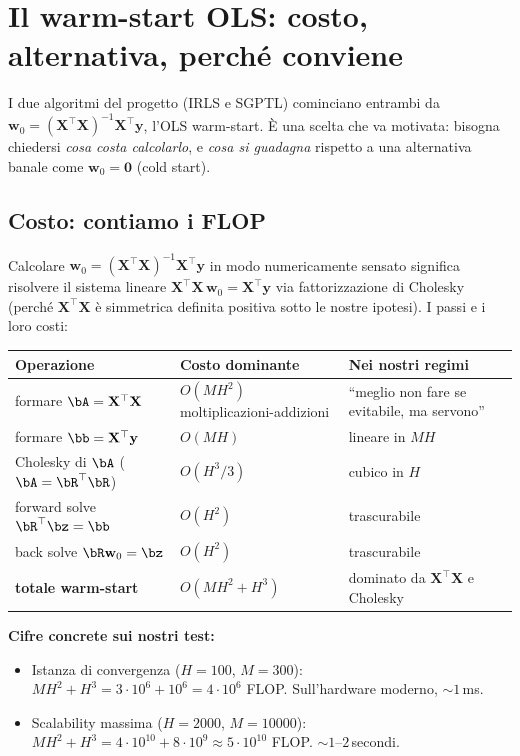 \documentclass[11pt,a4paper]{article}
\newcommand{\bw}{\mathbf{w}}
\newcommand{\by}{\mathbf{y}}
\newcommand{\bX}{\mathbf{X}}
\newcommand{\bzero}{\mathbf{0}}
\theoremstyle{definition}
\begin{document}
\section{Il warm-start OLS: costo, alternativa, perché conviene}
\label{sec:warmstart}

I due algoritmi del progetto (IRLS e SGPTL) cominciano entrambi da $\bw_0 = (\bX^\top\bX)^{-1}\bX^\top\by$, l'OLS warm-start. È una scelta che va motivata: bisogna chiedersi \emph{cosa costa calcolarlo}, e \emph{cosa si guadagna} rispetto a una alternativa banale come $\bw_0 = \bzero$ (cold start).

\subsection{Costo: contiamo i FLOP}

Calcolare $\bw_0 = (\bX^\top\bX)^{-1}\bX^\top\by$ in modo numericamente sensato significa risolvere il sistema lineare $\bX^\top\bX\,\bw_0 = \bX^\top\by$ via fattorizzazione di Cholesky (perché $\bX^\top\bX$ è simmetrica definita positiva sotto le nostre ipotesi). I passi e i loro costi:

\begin{center}\small
\begin{tabular}{lll}
\hline
\textbf{Operazione} & \textbf{Costo dominante} & \textbf{Nei nostri regimi}\\
\hline
formare $\bA = \bX^\top\bX$ & $O(M H^2)$ moltiplicazioni-addizioni & ``meglio non fare se evitabile, ma servono'' \\
formare $\bb = \bX^\top\by$ & $O(M H)$ & lineare in $M H$ \\
Cholesky di $\bA$ ($\bA = \bR^\top\bR$) & $O(H^3/3)$ & cubico in $H$ \\
forward solve $\bR^\top\bz = \bb$ & $O(H^2)$ & trascurabile \\
back solve $\bR\bw_0 = \bz$ & $O(H^2)$ & trascurabile \\
\hline
\textbf{totale warm-start} & $\boxed{O(M H^2 + H^3)}$ & dominato da $\bX^\top\bX$ e Cholesky\\
\hline
\end{tabular}
\end{center}

\textbf{Cifre concrete sui nostri test:}
\begin{itemize}[leftmargin=*]
\item Istanza di convergenza ($H=100$, $M=300$): $M H^2 + H^3 = 3\cdot 10^6 + 10^6 = 4\cdot 10^6$ FLOP. Sull'hardware moderno, $\sim 1\,$ms.
\item Scalability massima ($H=2000$, $M=10000$): $M H^2 + H^3 = 4\cdot 10^{10} + 8\cdot 10^9 \approx 5\cdot 10^{10}$ FLOP. $\sim 1$--$2\,$secondi.
\end{itemize}
\end{document}
